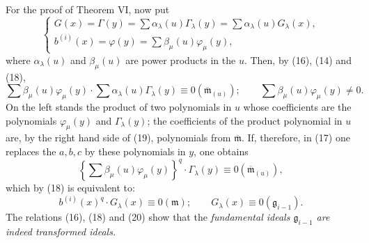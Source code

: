 \documentclass[11pt]{article}
\newcommand{\mideal}{\mathfrak m}
\newcommand{\gideal}{\mathfrak g}
\newcommand{\zero}[1]{\equiv 0(#1)}
\begin{document}
For the proof of Theorem VI, now put
\begin{equation}
\begin{cases}
 G(x)=\Gamma(y)=\sum \alpha_\lambda(u)\Gamma_\lambda(y)=\sum \alpha_\lambda(u)G_\lambda(x),\\
 b^{(i)}(x)=\varphi(y)=\sum \beta_\mu(u)\varphi_\mu(y),
\end{cases}
\tag{18}
\end{equation}
where $\alpha_\lambda(u)$ and $\beta_\mu(u)$ are power products in the $u$. Then, by (16), (14) and (18),
\begin{equation}
 \sum\beta_\mu(u)\varphi_\mu(y)\cdot
 \sum\alpha_\lambda(u)\Gamma_\lambda(y)\zero{\overline{\mideal}_{(u)}};
 \qquad
 \sum\beta_\mu(u)\varphi_\mu(y)\ne0.
\tag{19}
\end{equation}
On the left stands the product of two polynomials in $u$ whose coefficients are the polynomials $\varphi_\mu(y)$ and $\Gamma_\lambda(y)$; the coefficients of the product polynomial in $u$ are, by the right hand side of (19), polynomials from $\overline{\mideal}$. If, therefore, in (17) one replaces the $a,b,c$ by these polynomials in $y$, one obtains
\[
 \left\{\sum\beta_\mu(u)\varphi_\mu(y)\right\}^q\cdot \Gamma_\lambda(y)\zero{\overline{\mideal}_{(u)}},
\]
which by (18) is equivalent to:
\begin{equation}
 b^{(i)}(x)^q\cdot G_\lambda(x)\zero{\mideal};
 \qquad
 G_\lambda(x)\zero{\gideal_{i-1}}.
\tag{20}
\end{equation}
The relations (16), (18) and (20) show that the \emph{fundamental ideals $\gideal_{i-1}$ are indeed transformed ideals.}
\end{document}
